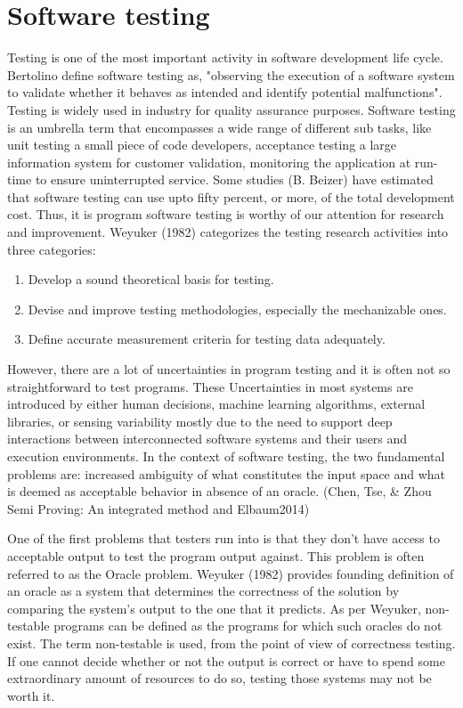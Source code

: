 \section{Software testing}
Testing is one of the most important activity in software development life cycle. Bertolino define software testing as, "observing the execution of a software system to validate whether it behaves as intended and identify potential malfunctions". Testing is widely used in industry for quality assurance purposes. Software testing is an umbrella term that encompasses a wide range of different sub tasks, like unit testing a small piece of code developers, acceptance testing a large information system for customer validation, monitoring the application at run-time to ensure uninterrupted service. Some studies (B. Beizer) have estimated that software testing can use upto fifty percent, or more, of the total development cost. Thus, it is program software testing is worthy of our attention for research and improvement. 
Weyuker (1982) categorizes the testing research activities into three categories:
\begin{enumerate}
  \item Develop a sound theoretical basis for testing.
  \item Devise and improve testing methodologies, especially the mechanizable ones.
  \item Define accurate measurement criteria for testing data adequately.
\end{enumerate}

However,  there are a lot of uncertainties in program testing and it is often not so straightforward to test programs. These Uncertainties in most systems are introduced by either human decisions, machine learning algorithms, external libraries, or sensing variability mostly due to the need to support deep interactions between interconnected software systems and their users and execution environments. In the context of software testing, the two fundamental problems are: increased ambiguity of what constitutes the input space and what is deemed as acceptable behavior in absence of an oracle. (Chen, Tse, & Zhou Semi Proving: An integrated method and Elbaum2014)

 One of the first problems that testers run into is that they don't have access to acceptable output to test the program output against. This problem is often referred to as the Oracle problem. Weyuker (1982) provides founding definition of an oracle as a system that determines the correctness of the solution by comparing the system’s output to the one that it predicts. As per Weyuker, non-testable programs can be defined as the programs for which such oracles do not exist. The term non-testable is used, from the point of view of correctness testing. If one cannot decide whether or not the output is correct or have to spend some extraordinary amount of resources to do so, testing those systems may not be worth it.
 
